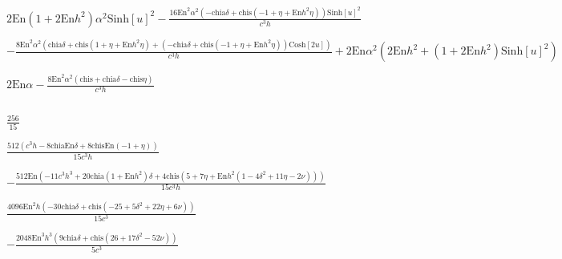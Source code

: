 \documentclass{article}
\begin{document}
\begin{doublespace}
\noindent\(2 \text{En} \left(1+2 \text{En} h^2\right) \alpha ^2 \text{Sinh}[u]^2-\frac{16 \text{En}^2 \alpha ^2 \left(-\text{chia} \delta +\text{chis}
\left(-1+\eta +\text{En} h^2 \eta \right)\right) \text{Sinh}[u]^2}{c^3 h}\)
\end{doublespace}

\begin{doublespace}
\noindent\(-\frac{8 \text{En}^2 \alpha ^2 \left(\text{chia} \delta +\text{chis} \left(1+\eta +\text{En} h^2 \eta \right)+\left(-\text{chia} \delta
+\text{chis} \left(-1+\eta +\text{En} h^2 \eta \right)\right) \text{Cosh}[2 u]\right)}{c^3 h}+2 \text{En} \alpha ^2 \left(2 \text{En} h^2+\left(1+2
\text{En} h^2\right) \text{Sinh}[u]^2\right)\)
\end{doublespace}

\begin{doublespace}
\noindent\(2 \text{En} \alpha -\frac{8 \text{En}^2 \alpha ^2 (\text{chis}+\text{chia} \delta -\text{chis} \eta )}{c^3 h}\)
\end{doublespace}

\noindent\(\text{}\)

\begin{doublespace}
\noindent\(\frac{256}{15}\)
\end{doublespace}

\begin{doublespace}
\noindent\(\frac{512 \left(c^3 h-8 \text{chia} \text{En} \delta +8 \text{chis} \text{En} (-1+\eta )\right)}{15 c^3 h}\)
\end{doublespace}

\begin{doublespace}
\noindent\(-\frac{512 \text{En} \left(-11 c^3 h^3+20 \text{chia} \left(1+\text{En} h^2\right) \delta +4 \text{chis} \left(5+7 \eta +\text{En} h^2
\left(1-4 \delta ^2+11 \eta -2 \nu \right)\right)\right)}{15 c^3 h}\)
\end{doublespace}

\begin{doublespace}
\noindent\(\frac{4096 \text{En}^2 h \left(-30 \text{chia} \delta +\text{chis} \left(-25+5 \delta ^2+22 \eta +6 \nu \right)\right)}{15 c^3}\)
\end{doublespace}

\begin{doublespace}
\noindent\(-\frac{2048 \text{En}^3 h^3 \left(9 \text{chia} \delta +\text{chis} \left(26+17 \delta ^2-52 \nu \right)\right)}{5 c^3}\)
\end{doublespace}
\end{document}
